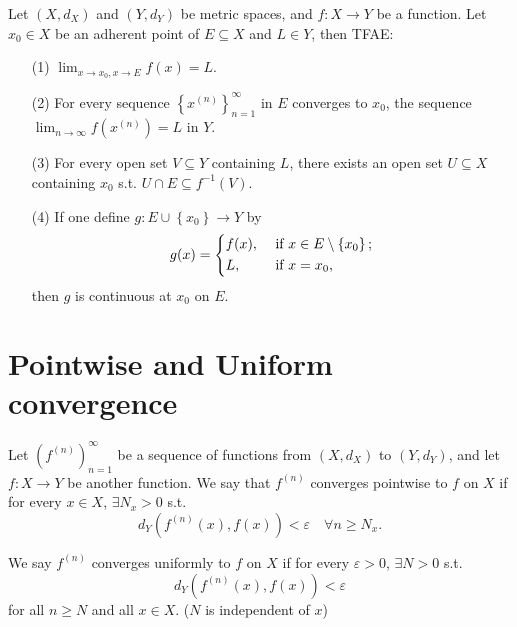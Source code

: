 \begin{proposition} \label{prop: conti TFAE again}
    Let \((X, d_X)\) and \((Y, d_Y)\) be metric spaces, and \(f: X \to  Y\) be a function. Let \(x_0 \in X\) be an adherent point of \(E \subseteq X\) and \(L \in Y\), then TFAE:
    \begin{itemize}
        \item [(1)] \(\lim_{x \to x_0, x \to E} f(x) = L \). 
        \item [(2)] For every sequence \(\left\{ x^{(n)} \right\}_{n=1}^{\infty}  \) in \(E\) converges to \(x_0\), the sequence \(\lim_{n \to \infty} f \left( x^{(n)} \right) = L  \) in \(Y\). 
        \item [(3)] For every open set \(V \subseteq Y\) containing \(L\), there exists an open set \(U \subseteq X\) containing \(x_0\) s.t. \(U \cap E \subseteq f^{-1}(V)\). 
        \item [(4)] If one define \(g: E \cup \left\{ x_0 \right\} \to  Y \) by 
        \[
            g(x) = \begin{dcases}
                f(x), &\text{ if } x \in E \setminus \left\{ x_0 \right\} ;\\
                L, &\text{ if } x = x_0, 
            \end{dcases}
        \] then \(g\) is continuous at \(x_0\) on \(E\).           
    \end{itemize}      
\end{proposition}

\section{Pointwise and Uniform convergence}
\begin{definition} \label{def: Pointwise convergence}
    Let \(\left( f^{(n)} \right)_{n=1}^{\infty}  \) be a sequence of functions from \((X, d_X)\) to \((Y, d_Y)\), and let \(f: X \to Y\) be another function. We say that \(f^{(n)}\) converges pointwise to \(f\) on \(X\) if for every \(x \in X\), \(\exists N_x > 0\) s.t.
    \[
        d_Y \left( f^{(n)}(x), f(x) \right) < \varepsilon \quad \forall n \ge N_x .
    \]        
\end{definition}

\begin{definition} \label{def: uniformly convergence}
    We say \(f^{(n)}\) converges uniformly to \(f\) on \(X\) if for every \(\varepsilon > 0\), \(\exists N > 0\) s.t. 
    \[
        d_Y \left( f^{(n)}(x), f(x) \right) < \varepsilon  
    \] for all \(n \ge N\) and all \(x \in X\). (\(N\) is independent of \(x\))    
\end{definition}

